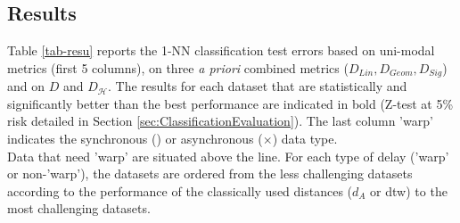 \subsection{Results}
Table \ref{tab-resu} reports the 1-NN classification test errors based on uni-modal metrics  (first 5 columns), on three \textit{a priori} combined metrics ($D_{Lin}, D_{Geom}, D_{Sig}$) and on  $D$ and $D_{\mathcal{H}}$. The results for each dataset that are statistically and significantly better than the best performance are indicated in bold (Z-test at  5\% risk detailed in Section \ref{sec:ClassificationEvaluation}). The last column '{\sc warp}' indicates the synchronous (\checkmark) or asynchronous ($\times$) data type. \\ 
Data that need '{\sc warp}' are situated above the line. For each type of delay ('{\sc warp}' or non-'{\sc warp}'), the datasets are ordered from the less challenging datasets according to the performance of the classically used distances ($d_A$ or {\sc dtw}) to the most challenging datasets.

